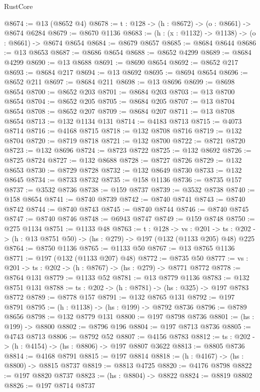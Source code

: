 \begin{lexlean}{RustCore}
\begin{coremodule}
@8674 := @13 (@8652 @4)
@8678 := {t : @128} -> (h : @8672) -> (o : @8661) -> @8674 @6284
@8679 := @8670 @1136
@8683 := (h : (x : @1132) -> @1138) -> (o : @8661) -> @8674 @8654
@8684 := @8679 @8657
@8685 := @8684 @8644
@8686 := @13 @8653
@8687 := @8686 @8654
@8688 := @8652 @4299
@8689 := @8684 @4299
@8690 := @13 @8688
@8691 := @8690 @8654
@8692 := @8652 @217
@8693 := @8684 @217
@8694 := @13 @8692
@8695 := @8694 @8654
@8696 := @8652 @211
@8697 := @8684 @211
@8698 := @13 @8696
@8699 := @8698 @8654
@8700 := @8652 @203
@8701 := @8684 @203
@8703 := @13 @8700 @8654
@8704 := @8652 @205
@8705 := @8684 @205
@8707 := @13 @8704 @8654
@8708 := @8652 @207
@8709 := @8684 @207
@8711 := @13 @8708 @8654
@8713 := @132 @1134 @131
@8714 := @4183 @8713
@8715 := @4073 @8714
@8716 := @4168 @8715
@8718 := @132 @8708 @8716
@8719 := @132 @8704
@8720 := @8719 @8718
@8721 := @132 @8700
@8722 := @8721 @8720
@8723 := @132 @8696
@8724 := @8723 @8722
@8725 := @132 @8692
@8726 := @8725 @8724
@8727 := @132 @8688
@8728 := @8727 @8726
@8729 := @132 @8653
@8730 := @8729 @8728
@8732 := @132 @8649 @8730
@8733 := @132 @8645
@8734 := @8733 @8732
@8735 := @158 @1136
@8736 := @8735 @157
@8737 := @3532 @8736
@8738 := @159 @8737
@8739 := @3532 @8738
@8740 := @158 @8654
@8741 := @8740 @8739
@8742 := @8740 @8741
@8743 := @8740 @8742
@8744 := @8740 @8743
@8745 := @8740 @8744
@8746 := @8740 @8745
@8747 := @8740 @8746
@8748 := @6943 @8747
@8749 := @159 @8748
@8750 := @275 @1134
@8751 := @1133 @48
@8763 := {t : @128} ->
  {vs : @201} ->
  {ts : @202} -> (h : @13 @8751 @50) -> (hs : @279) -> @197 (@132 (@1133 @205) @48) @225
@8764 := @8750 @1136
@8765 := @1133 @50
@8767 := @13 @8765 @1136
@8771 := @197 (@132 (@1133 @207) @48)
@8772 := @8735 @50
@8777 := {vs : @201} -> {ts : @202} -> (h : @8767) -> (hs : @279) -> @8771 @8772
@8778 := @8764 @131
@8779 := @1133 @52
@8781 := @13 @8779 @1136
@8783 := @132 @8751 @131
@8788 := {ts : @202} -> (h : @8781) -> (hs : @325) -> @197 @8783 @8772
@8789 := @8778 @157
@8791 := @132 @8765 @131
@8792 := @197 @8791
@8795 := (h : @1138) -> (hs : @199) -> @8792 @8736
@8796 := @8789 @8656
@8798 := @132 @8779 @131
@8800 := @197 @8798 @8736
@8801 := (hs : @199) -> @8800
@8802 := @8796 @196
@8804 := @197 @8713 @8736
@8805 := @4743 @8713
@8806 := @8792 @52
@8807 := @4156 @8783
@8812 := {ts : @202} -> (h : @4154) -> (hs : @8806) -> @197 @8807 @3622
@8813 := @8805 @8736
@8814 := @4168 @8791
@8815 := @197 @8814
@8818 := (h : @4167) -> (hs : @8800) -> @8815 @8737
@8819 := @8813 @4725
@8820 := @4176 @8798
@8822 := @197 @8820 @8737
@8823 := (hs : @8804) -> @8822
@8824 := @8819 @8802
@8826 := @197 @8714 @8737

\end{coremodule}
\end{lexlean}
